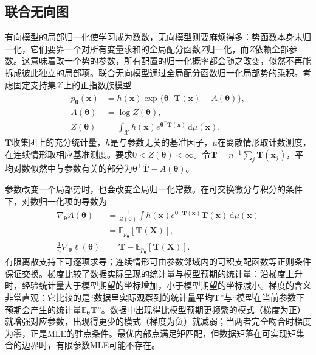 \subsection{联合无向图}
\label{sec:pgm-parameter-learning-undirected}

有向模型的局部归一化使学习成为数数，无向模型则要麻烦得多：势函数本身未归一化，它们要靠一个对所有变量求和的全局配分函数$Z$归一化，而$Z$依赖全部参数。这意味着改一个势的参数，所有配置的归一化概率都会随之改变，似然不再能拆成彼此独立的局部项。联合无向模型通过全局配分函数归一化局部势的乘积。考虑固定支持集$\mathcal{X}$上的正指数族模型
\begin{equation}
  \begin{aligned}
    p_{\bm{\theta}}(\bm{x})
      &=h(\bm{x})
        \exp\{\bm{\theta}^\top\bm{T}(\bm{x})-A(\bm{\theta})\},\\
    A(\bm{\theta})&=\log Z(\bm{\theta}),\\
    Z(\bm{\theta})
      &=\int_{\mathcal{X}}h(\bm{x})
        e^{\bm{\theta}^\top\bm{T}(\bm{x})}\,\mathrm{d}\mu(\bm{x}).
  \end{aligned}
  \label{eq:pgm-parameter-learning-exponential-model}
\end{equation}
$\bm{T}$收集团上的充分统计量，$h$是与参数无关的基准因子，$\mu$在离散情形取计数测度，在连续情形取相应基准测度。要求$0<Z(\bm{\theta})<\infty$。令$\overline{\bm{T}}=n^{-1}\sum_j\bm{T}(\bm{x}_j)$，平均对数似然中与参数有关的部分为$\bm{\theta}^\top\overline{\bm{T}}-A(\bm{\theta})$。

参数改变一个局部势时，也会改变全局归一化常数。在可交换微分与积分的条件下，对数归一化项的导数为
\begin{equation}
  \begin{aligned}
    \nabla_{\bm{\theta}} A(\bm{\theta})
      &=\frac{1}{Z(\bm{\theta})}
        \int h(\bm{x})e^{\bm{\theta}^\top\bm{T}(\bm{x})}
             \bm{T}(\bm{x})\,\mathrm{d}\mu(\bm{x})\\
      &=\mathbb{E}_{p_{\bm{\theta}}}[\bm{T}(\bm{X})],\\
    \frac{1}{n}\nabla_{\bm{\theta}}\ell(\bm{\theta})
      &=\overline{\bm{T}}
        -\mathbb{E}_{p_{\bm{\theta}}}[\bm{T}(\bm{X})].
  \end{aligned}
  \label{eq:pgm-parameter-learning-moment-gradient}
\end{equation}
有限离散支持下可逐项求导；连续情形可由参数邻域内的可积支配函数等正则条件保证交换。梯度比较了数据实际呈现的统计量与模型预期的统计量：沿梯度上升时，经验统计量大于模型期望的坐标增加，小于模型期望的坐标减小。梯度的含义非常直观：它比较的是“数据里实际观察到的统计量平均$\overline{\bm T}$”与“模型在当前参数下预期会产生的统计量$\mathbb E_{\bm\theta}\bm T$”。数据中出现得比模型预期更频繁的模式（梯度为正）就增强对应参数，出现得更少的模式（梯度为负）就减弱；当两者完全吻合时梯度为零，正是MLE的驻点条件。最优内部点满足矩匹配，但数据矩落在可实现矩集合的边界时，有限参数MLE可能不存在。

